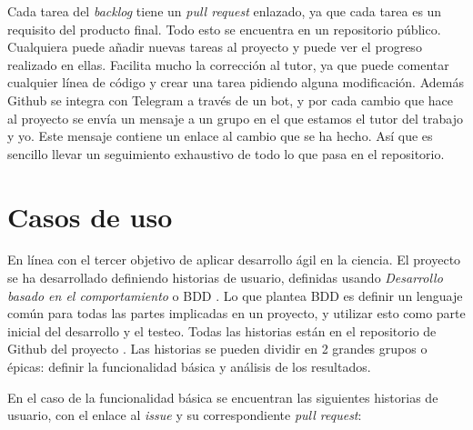 Cada tarea del \emph{backlog} tiene un \emph{pull request} enlazado, ya que cada tarea es un requisito del producto final. Todo
esto se encuentra en un repositorio público. Cualquiera puede añadir nuevas tareas al proyecto y puede ver el progreso realizado en ellas.
Facilita mucho la corrección al tutor, ya que puede comentar cualquier línea de código y crear una tarea pidiendo alguna
modificación. Además Github se integra con Telegram a través de un bot, y por cada cambio que hace al proyecto se envía un mensaje
a un grupo en el que estamos el tutor del trabajo y yo. Este mensaje contiene un enlace al cambio que se ha hecho. Así
que es sencillo llevar un seguimiento exhaustivo de todo lo que pasa en el repositorio.

\section{}
\section{Casos de uso}

En línea con el tercer objetivo de aplicar desarrollo ágil en la ciencia. El proyecto se ha desarrollado definiendo
historias de usuario, definidas usando \emph{Desarrollo basado en el comportamiento} o BDD \cite{BDD}. Lo que 
plantea BDD es definir un lenguaje común para todas las partes implicadas en un proyecto, y utilizar esto como parte inicial 
del desarrollo y el testeo. Todas las historias están en el repositorio de Github del proyecto \cite{project_repository}.
Las historias se pueden dividir en 2 grandes grupos o épicas: definir la funcionalidad básica y análisis de los resultados.

En el caso de la funcionalidad básica se encuentran las siguientes historias de usuario, con el enlace al
\emph{issue} y su correspondiente \emph{pull request}:

